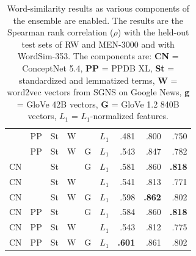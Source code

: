 \documentclass[11pt,letterpaper]{article}
\begin{document}
\begin{table}[t]
\begin{tabular}{llllll|rrr}
     & PP   & St   & W    &      & $L_1$  &    .481 &    .800 &    .750 \\  %
     & PP   & St   & W    & G    & $L_1$  &    .543 &    .847 &    .782 \\  %
CN   &      & St   &      & G    & $L_1$  &    .581 &    .860 &\bf .818 \\  %
CN   &      & St   & W    &      & $L_1$  &    .541 &    .813 &    .771 \\  %
CN   &      & St   & W    & G    & $L_1$  &    .598 &\bf .862 &    .802 \\  %
CN   & PP   & St   &      & G    & $L_1$  &    .584 &    .860 &\bf .818 \\  %
CN   & PP   & St   & W    &      & $L_1$  &    .543 &    .812 &    .775 \\  %
CN   & PP   & St   & W    & G    & $L_1$  &\bf .601 &    .861 &    .802 \\  %
\bottomrule
\end{tabular}

\caption{
    Word-similarity results as various components of the ensemble are enabled.
    The results are the Spearman rank correlation ($\rho$) with the held-out
    test sets of RW and MEN-3000 and with WordSim-353.
    The components are: {\bf CN} = ConceptNet 5.4,
    {\bf PP} = PPDB XL, {\bf St} = standardized and lemmatized terms,
    {\bf W} = word2vec vectors from SGNS on Google News, {\bf g} = GloVe 42B vectors,
    {\bf G} = GloVe 1.2 840B vectors, {\bf $L_1$} = $L_1$-normalized features.
}
\label{eval-bigtable}
\end{table}
\end{document}
